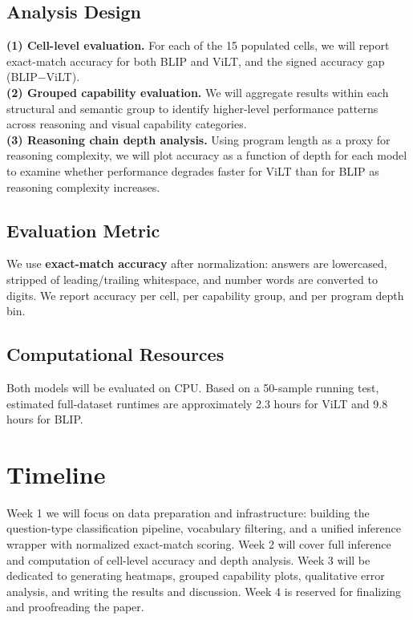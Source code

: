 \documentclass[11pt]{article}
\begin{document}
\subsection{Analysis Design}

\textbf{(1) Cell-level evaluation.} For each of the 15 populated cells, we will report exact-match accuracy for both BLIP and ViLT, and the signed accuracy gap (BLIP$-$ViLT).\\
\textbf{(2) Grouped capability evaluation.} We will aggregate results within each structural and semantic group to identify higher-level performance patterns across reasoning and visual capability categories.\\
\textbf{(3) Reasoning chain depth analysis.} Using program length as a proxy for reasoning complexity, we will plot accuracy as a function of depth for each model to examine whether performance degrades faster for ViLT than for BLIP as reasoning complexity increases.

\subsection{Evaluation Metric}

We use \textbf{exact-match accuracy} after normalization: answers are lowercased, stripped of leading/trailing whitespace, and number words are converted to digits. We report accuracy per cell, per capability group, and per program depth bin.

\subsection{Computational Resources}

Both models will be evaluated on CPU. Based on a 50-sample running test, estimated full-dataset runtimes are approximately 2.3 hours for ViLT and 9.8 hours for BLIP.

\section{Timeline}
Week 1 we will focus on data preparation and infrastructure: building the question-type classification pipeline, vocabulary filtering, and a unified inference wrapper with normalized exact-match scoring. Week 2 will cover full inference and computation of cell-level accuracy and depth analysis. Week 3 will be dedicated to generating heatmaps, grouped capability plots, qualitative error analysis, and writing the results and discussion. Week 4 is reserved for finalizing and proofreading the paper.



\end{document}
